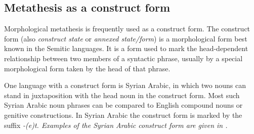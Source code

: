 \subsection{Metathesis as a construct form}\label{sec:ConFor}
Morphological metathesis is frequently used as a construct form.
The construct form (also \emph{construct state} or \emph{annexed state/form})
is a morphological form best known in the Semitic languages.
It is a form used to mark the head-dependent relationship
between two members of a syntactic phrase,
usually by a special morphological form taken by the head of that phrase.

One language with a construct form is Syrian Arabic,
in which two nouns can stand in juxtaposition
with the head noun in the construct form.
Most such Syrian Arabic noun phrases can be compared
to English compound nouns or genitive constructions.
In Syrian Arabic the construct form is marked by the suffix \it{-(e)t}.
Examples of the Syrian Arabic construct form are given in .

\begin{exe}
	\label{ex:SyrAraConFor}
\end{exe}

